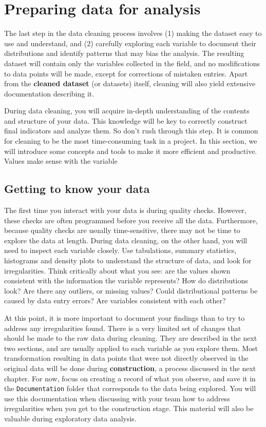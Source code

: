 \section{Preparing data for analysis}

The last step in the data cleaning process involves
(1) making the dataset easy to use and understand, and 
(2) carefully exploring each variable to document their distributions 
and identify patterns that may bias the analysis.
The resulting dataset will contain only the variables collected in the field, and
no modifications to data points will be made, 
except for corrections of mistaken entries.
Apart from the \textbf{cleaned dataset} (or datasets) itself,
cleaning will also yield extensive documentation describing  it.

During data cleaning, you will acquire in-depth understanding of the contents and structure of your data.
This knowledge will be key to correctly construct final indicators and analyze them.
So don't rush through this step.
It is common for cleaning to be the most time-consuming task in a project.
In this section, we will introduce some concepts and tools to make it more efficient and productive.
Values make sense with the variable

\subsection{Getting to know your data}

The first time you interact with your data is during quality checks.
However, these checks are often programmed before you receive all the data.
Furthermore, because quality checks are usually time-sensitive, 
there may not be time to explore the data at length.
During data cleaning, on the other hand, 
you will need to inspect each variable closely.
Use tabulations, summary statistics, histograms and density plots to understand the structure of data,
and look for irregularities.
Think critically about what you see:
are the values shown consistent with the information the variable represents?
How do distributions look? 
Are there any outliers, or missing values?
Could distributional patterns be caused by data entry errors?
Are variables consistent with each other?

At this point, it is more important to document your findings
than to try to address any irregularities found.
There is a very limited set of changes that should be made to the raw data during cleaning.
They are described in the next two sections,
and are usually applied to each variable as you explore them.
Most transformation resulting in data points that were not directly observed in the original data
will be done during \textbf{construction}, a process discussed in the next chapter.
For now, focus on creating a record of what you observe,
and save it in the \texttt{Documentation} folder that corresponds to the data being explored.
You will use this documentation when discussing with your team
how to address irregularities when you get to the construction stage.
This material will also be valuable during exploratory data analysis.


